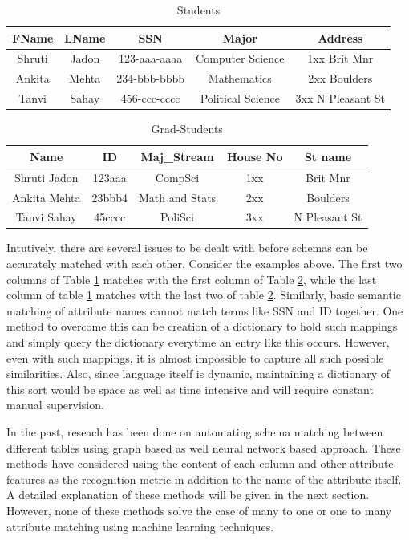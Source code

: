 \documentclass[conference]{IEEEtran}
\begin{document}
\begin{table}[h]
\centering
\caption{Students}
\begin{tabular}{|c|c|c|c|c|}
\hline
FName & LName & SSN & Major & Address\\
\hline \hline
Shruti & Jadon & 123-aaa-aaaa & Computer Science & 1xx Brit Mnr\\
Ankita & Mehta & 234-bbb-bbbb & Mathematics & 2xx Boulders\\
Tanvi & Sahay & 456-ccc-cccc & Political Science & 3xx N Pleasant St\\
\hline
\end{tabular}
\label{students}
\end{table}

\begin{table}[h]
\centering
\caption{Grad-Students}
\begin{tabular}{|c|c|c|c|c|}
\hline
Name & ID & Maj\_Stream & House No & St name\\
\hline \hline
Shruti Jadon & 123aaa & CompSci & 1xx & Brit Mnr\\
Ankita Mehta & 23bbb4 & Math and Stats & 2xx & Boulders\\
Tanvi Sahay & 45cccc & PoliSci & 3xx & N Pleasant St\\
\hline
\end{tabular}
\label{grad-students}
\end{table}

\noindent
Intutively, there are several issues to be dealt with before schemas can be accurately matched with each other. Consider the examples above. The first two columns of Table \ref{students} matches with the first column of Table \ref{grad-students}, while the last column of table \ref{students} matches with the last two of table \ref{grad-students}. Similarly, basic semantic matching of attribute names cannot match terms like SSN and ID together. One method to overcome this can be creation of a dictionary to hold such mappings and simply query the dictionary everytime an entry like this occurs. However, even with such mappings, it is almost impossible to capture all such possible similarities. Also, since language itself is dynamic, maintaining a dictionary of this sort would be space as well as time intensive and will require constant manual supervision. 

In the past, reseach has been done on automating schema matching between different tables using graph based as well neural network based approach. These methods have considered using the content of each column and other attribute features as the recognition metric in addition to the name of the attribute itself. A detailed explanation of these methods will be given in the next section. However, none of these methods solve the case of many to one or one to many attribute matching using machine learning techniques. 
\end{document}
